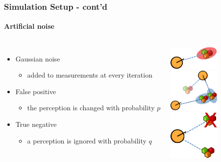 \begin{frame}
	\frametitle{Simulation Setup - cont'd}
	\framesubtitle{Artificial noise}
	\begin{columns}[T]
		
		\begin{itemize}
			\item Gaussian noise
				\begin{itemize}
					\item added to measurements at every iteration
				\end{itemize}
			\vspace{0.5cm}
			\item False positive
				\begin{itemize}
					\item the perception is changed with probability $ p $
				\end{itemize}
			\vspace{0.5cm}
			\item True negative
				\begin{itemize}
					\item a perception is ignored with probability $ q $
				\end{itemize}
		\end{itemize}
		
		\centering
		\includegraphics[width=2.5cm]{Figures/ErrorGauss.pdf} \\
		\vspace{0.1cm}
		\includegraphics[width=2.5cm]{Figures/ErrorFalse.pdf} \\
		\vspace{0.1cm}
		\includegraphics[width=2.5cm]{Figures/ErrorTrue.pdf}
	\end{columns}
\end{frame}

